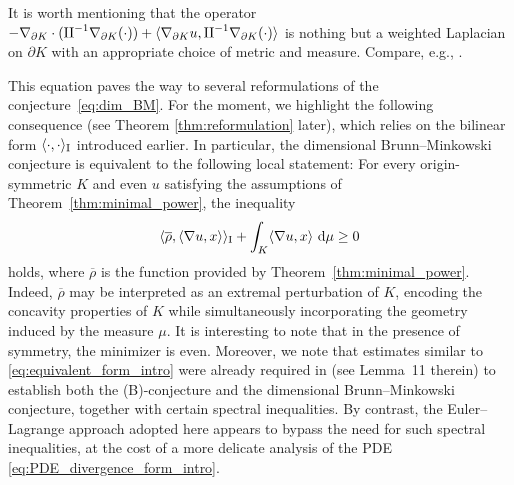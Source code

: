 \documentclass[a4paper, 11pt]{article}
\theoremstyle{definition}
\newcommand{\di}{\, \mathrm{d}}
\begin{document}
It is worth mentioning that the operator $-\nabla_{\partial K} \cdot ({\rm II}^{-1}\nabla_{\partial K} (\cdot) )+\langle \nabla_{\partial K}u,{\rm II}^{-1}\nabla_{\partial K}(\cdot) \rangle$ is nothing but a weighted Laplacian on $\partial K$ with an appropriate choice of metric and measure. Compare, e.g., \cite[Section 6.5]{Kol_Mil_P}. 

This equation paves the way to several reformulations of the conjecture~\eqref{eq:dim_BM}. For the moment, we highlight the following consequence (see Theorem \ref{thm:reformulation} later), which relies on the bilinear form $\langle \cdot, \cdot \rangle_{\rm I}$ introduced earlier. In particular, the dimensional Brunn--Minkowski conjecture is equivalent to the following local statement: For every origin-symmetric $K$ and even $u$ satisfying the assumptions of Theorem~\ref{thm:minimal_power}, the
inequality
\begin{equation}\label{eq:equivalent_form_intro}
\langle \overline{\rho}, \langle \nabla u, x \rangle \rangle_{\rm I}+\int_K \langle \nabla u, x \rangle\, \di \mu \geq 0
\end{equation}
holds, where $\overline{\rho}$ is the function provided by Theorem~\ref{thm:minimal_power}.  Indeed, $\overline{\rho}$ may be interpreted as an extremal perturbation of $K$, encoding the concavity properties of $K$ while simultaneously incorporating the geometry induced by the measure $\mu$. It is interesting to note that in the presence of symmetry, the minimizer is even. Moreover, we note that estimates similar to \eqref{eq:equivalent_form_intro} were already required in \cite{cordero2025concavity} (see Lemma~11 therein) to establish both the (B)-conjecture and the dimensional Brunn--Minkowski conjecture, together with certain spectral inequalities. By contrast, the Euler--Lagrange approach adopted here appears to bypass the need for such spectral inequalities, at the cost of a more delicate analysis of the PDE \eqref{eq:PDE_divergence_form_intro}.

\medskip
\end{document}

